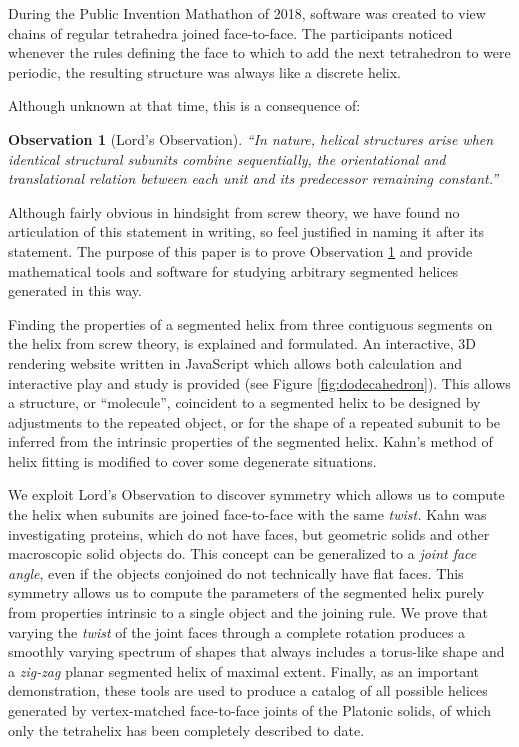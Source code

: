 \documentclass[11pt]{article}
\newtheorem{observation}{Observation}
\begin{document}
{During the Public Invention Mathathon of 2018\cite{read2019mathathon}, software was
created to view chains of regular tetrahedra joined face-to-face.
The participants noticed whenever the rules
defining the face to which to add the next
tetrahedron
to were periodic, the resulting
structure was always like a discrete helix.

Although unknown at that time, this is a consequence of:
\begin{observation}[Lord's Observation]
  “In nature, helical structures arise when identical structural subunits combine sequentially, the orientational and translational relation between each unit and its predecessor remaining constant.”\cite{lord2002helical}
  \label{obs:lords}
\end{observation}
Although fairly obvious in hindsight from screw theory, we have found no articulation of this statement
in writing, so feel justified in naming it after its statement.
The purpose of this paper is to prove Observation \ref{obs:lords} and provide mathematical
tools and software for studying arbitrary
segmented helices generated in this way.

Finding the properties of a segmented helix from three contiguous segments on the helix from screw theory\cite{abbasi2015review,wittenburg2016kinematics,wiki:screwaxis,kahn1989defining},
is explained and formulated.
An interactive, 3D rendering website written in JavaScript which allows both calculation and
interactive play and study is provided\cite{segmentedhelixinteractive}
(see Figure \ref{fig:dodecahedron}). This allows
a structure, or ``molecule'', coincident to a segmented helix to be designed
by adjustments to the repeated object, or for the shape of
a repeated subunit to be inferred from the intrinsic properties of the
segmented helix.
Kahn's method of helix fitting\cite{kahn1989defining} is modified to cover some degenerate situations.

We exploit Lord's Observation to discover symmetry which allows us to compute the helix when subunits are joined face-to-face with
the same {\em twist.} Kahn was investigating proteins, which do not have faces, but geometric solids and other macroscopic solid objects do.
This concept can be generalized to a {\em joint face angle}, even if the
objects conjoined do not technically have flat faces.
This symmetry allows us to compute the parameters of the segmented helix purely from
properties intrinsic to a single object and the joining rule.
We prove that varying the {\em twist} of the joint faces through a complete rotation produces a smoothly varying
spectrum of shapes that always includes a torus-like shape and a
{\em zig-zag} planar segmented helix of maximal extent.
Finally, as an important demonstration, these tools are used to produce
a catalog of all possible helices generated by vertex-matched face-to-face joints of the
Platonic solids, of which only the tetrahelix\cite{coxeter1985simplicial,sadler2013periodic,fuller1982synergetics,read2018transforming,pearce1990structure}
has been completely described to date.

}
\end{document}
